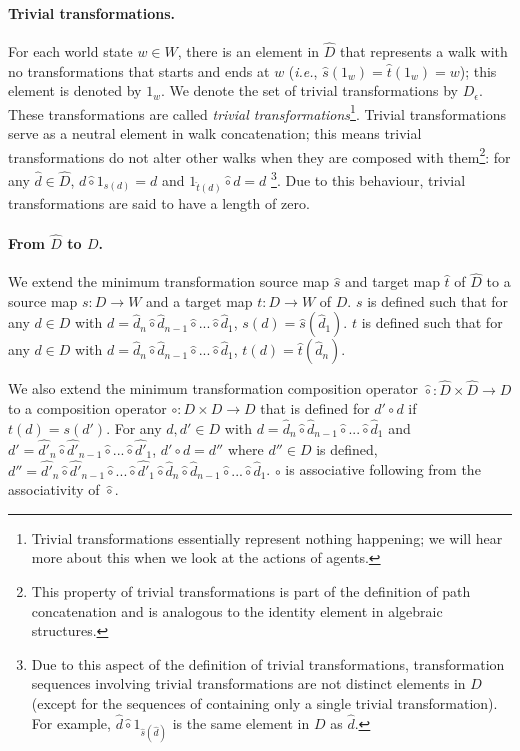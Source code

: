 \paragraph{Trivial transformations.} 
For each world state $w \in W$, there is an element in $\hat{D}$ that represents a walk with no transformations that starts and ends at $w$ (\textit{i.e.}, $\hat{s}(1_{w}) = \hat{t}(1_{w}) = w$); this element is denoted by $1_{w}$.
We denote the set of trivial transformations by $D_{\epsilon}$.
These transformations are called \emph{trivial transformations}\footnote{Trivial transformations essentially represent nothing happening; we will hear more about this when we look at the actions of agents.}.
Trivial transformations serve as a neutral element in walk concatenation; this means trivial transformations do not alter other walks when they are composed with them\footnote{This property of trivial transformations is part of the definition of path concatenation and is analogous to the identity element in algebraic structures.}: for any $\hat{d} \in \hat{D}$, $d \hat{\circ} 1_{\hat{s}(d)} = d$ and $1_{\hat{t}(d)} \hat{\circ} d = d$ \footnote{Due to this aspect of the definition of trivial transformations, transformation sequences involving trivial transformations are not distinct elements in $D$ (except for the sequences of containing only a single trivial transformation).
For example, $\hat{d} \hat{\circ} 1_{\hat{s}(\hat{d})}$ is the same element in $D$ as $\hat{d}$.}.
Due to this behaviour, trivial transformations are said to have a length of zero.

\paragraph{From $\hat{D}$ to $D$.}
We extend the minimum transformation source map $\hat{s}$ and target map $\hat{t}$ of $\hat{D}$ to a source map $s: D \to W$ and a target map $t: D \to W$ of $D$.
$s$ is defined such that for any $d \in D$ with $d = \hat{d}_{n} \hat{\circ} \hat{d}_{n-1} \hat{\circ} ... \hat{\circ} \hat{d}_{1}$, $s(d) = \hat{s}(\hat{d}_{1})$.
$t$ is defined such that for any $d \in D$ with $d = \hat{d}_{n} \hat{\circ} \hat{d}_{n-1} \hat{\circ} ... \hat{\circ} \hat{d}_{1}$, $t(d) = \hat{t}(\hat{d}_{n})$.

We also extend the minimum transformation composition operator $\hat{\circ}: \hat{D} \times \hat{D} \to D$ to a composition operator $\circ: D \times D \to D$ that is defined for $d' \circ d$ if $t(d) = s(d')$.
For any $d, d' \in D$ with $d = \hat{d}_{n} \hat{\circ} \hat{d}_{n-1} \hat{\circ} ... \hat{\circ} \hat{d}_{1}$ and $d' = \hat{d'}_{n} \hat{\circ} \hat{d'}_{n-1} \hat{\circ} ... \hat{\circ} \hat{d'}_{1}$, $d' \circ d = d''$ where $d'' \in D$ is defined, $d'' = \hat{d'}_{n} \hat{\circ} \hat{d'}_{n-1} \hat{\circ} ... \hat{\circ} \hat{d'}_{1} \hat{\circ} \hat{d}_{n} \hat{\circ} \hat{d}_{n-1} \hat{\circ} ... \hat{\circ} \hat{d}_{1}$.
$\circ$ is associative following from the associativity of $\hat{\circ}$.

